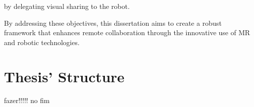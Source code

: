 \begin{itemize}
\begin{itemize}
        by delegating visual sharing to the robot.
    \end{itemize}
\end{itemize}

By addressing these objectives, this dissertation aims to create a robust framework that enhances remote collaboration through the innovative use 
of \ac{MR} and robotic technologies.



\section{Thesis' Structure}
% 
fazer!!!!! no fim 